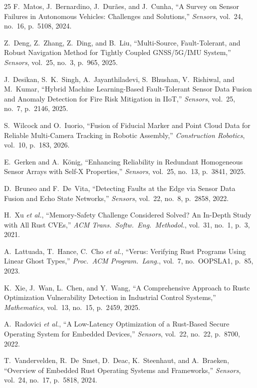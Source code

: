 \documentclass[12pt,a4paper]{article}
\begin{document}
\begin{thebibliography}{25}
F.~Matos, J.~Bernardino, J.~Durães, and J.~Cunha, ``A Survey on Sensor Failures in Autonomous Vehicles: Challenges and Solutions,'' \textit{Sensors}, vol.~24, no.~16, p.~5108, 2024.

Z.~Deng, Z.~Zhang, Z.~Ding, and B.~Liu, ``Multi-Source, Fault-Tolerant, and Robust Navigation Method for Tightly Coupled GNSS/5G/IMU System,'' \textit{Sensors}, vol.~25, no.~3, p.~965, 2025.

J.~Desikan, S.~K.~Singh, A.~Jayanthiladevi, S.~Bhushan, V.~Rishiwal, and M.~Kumar, ``Hybrid Machine Learning-Based Fault-Tolerant Sensor Data Fusion and Anomaly Detection for Fire Risk Mitigation in IIoT,'' \textit{Sensors}, vol.~25, no.~7, p.~2146, 2025.

S.~Wilcock and O.~Iuorio, ``Fusion of Fiducial Marker and Point Cloud Data for Reliable Multi-Camera Tracking in Robotic Assembly,'' \textit{Construction Robotics}, vol.~10, p.~183, 2026.

E.~Gerken and A.~K\"onig, ``Enhancing Reliability in Redundant Homogeneous Sensor Arrays with Self-X Properties,'' \textit{Sensors}, vol.~25, no.~13, p.~3841, 2025.

D.~Bruneo and F.~De~Vita, ``Detecting Faults at the Edge via Sensor Data Fusion and Echo State Networks,'' \textit{Sensors}, vol.~22, no.~8, p.~2858, 2022.

H.~Xu \textit{et al.}, ``Memory-Safety Challenge Considered Solved? An In-Depth Study with All Rust CVEs,'' \textit{ACM Trans.\ Softw.\ Eng.\ Methodol.}, vol.~31, no.~1, p.~3, 2021.

A.~Lattuada, T.~Hance, C.~Cho \textit{et al.}, ``Verus: Verifying Rust Programs Using Linear Ghost Types,'' \textit{Proc.\ ACM Program.\ Lang.}, vol.~7, no.~OOPSLA1, p.~85, 2023.

K.~Xie, J.~Wan, L.~Chen, and Y.~Wang, ``A Comprehensive Approach to Rustc Optimization Vulnerability Detection in Industrial Control Systems,'' \textit{Mathematics}, vol.~13, no.~15, p.~2459, 2025.

A.~Radovici \textit{et al.}, ``A Low-Latency Optimization of a Rust-Based Secure Operating System for Embedded Devices,'' \textit{Sensors}, vol.~22, no.~22, p.~8700, 2022.

T.~Vandervelden, R.~De~Smet, D.~Deac, K.~Steenhaut, and A.~Braeken, ``Overview of Embedded Rust Operating Systems and Frameworks,'' \textit{Sensors}, vol.~24, no.~17, p.~5818, 2024.


\end{thebibliography}
\end{document}
